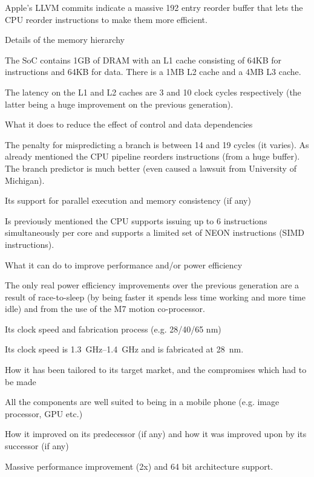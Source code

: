 \documentclass{supervision}
\begin{document}
\begin{questions}
\begin{solution}
    Apple's LLVM commits indicate a massive 192 entry reorder buffer that lets the CPU reorder instructions to make them more efficient.
    \end{solution}

    \question
    Details of the memory hierarchy
    \begin{solution}
    The SoC contains 1GB of DRAM with an L1 cache consisting of 64KB for instructions and 64KB for data. There is a 1MB L2 cache and a 4MB L3 cache.
    
    The latency on the L1 and L2 caches are 3 and 10 clock cycles respectively (the latter being a huge improvement on the previous generation).
    \end{solution}

    \question
    What it does to reduce the effect of control and data dependencies
    \begin{solution}
    The penalty for mispredicting a branch is between 14 and 19 cycles (it varies). As already mentioned the CPU pipeline reorders instructions (from a huge buffer). The branch predictor is much better (even caused a lawsuit from University of Michigan).
    \end{solution}

    \question
    Its support for parallel execution and memory consistency (if any)
    \begin{solution}
    Is previously mentioned the CPU supports issuing up to 6 instructions simultaneously per core and supports a limited set of NEON instructions (SIMD instructions).
    \end{solution}

    \question
    What it can do to improve performance and/or power efficiency
    \begin{solution} 
    The only real power efficiency improvements over the previous generation are a result of race-to-sleep (by being faster it spends less time working and more time idle) and from the use of the M7 motion co-processor. 
    \end{solution}

    \question
    Its clock speed and fabrication process (e.g. 28/40/65 nm)
    \begin{solution}
    Its clock speed is \SIrange{1.3}{1.4}{\GHz} and is fabricated at \SI{28}{nm}.
    \end{solution}

    \question
    How it has been tailored to its target market, and the compromises which had to be made
    \begin{solution}
    All the components are well suited to being in a mobile phone (e.g. image processor, GPU etc.)
    \end{solution}

    \question
    How it improved on its predecessor (if any) and how it was improved upon by its successor (if any)
    \begin{solution}
    Massive performance improvement (2x) and 64 bit architecture support.
    \end{solution}

\end{questions}
\end{document}
